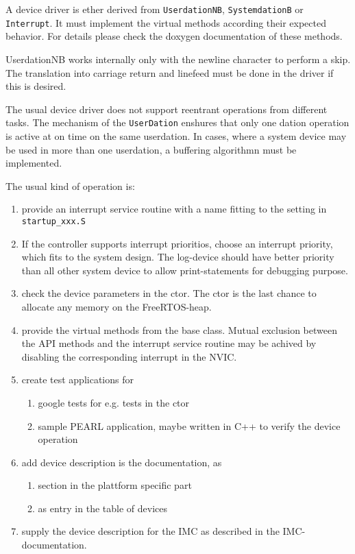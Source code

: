 A device driver is ether derived from \verb|UserdationNB|,
 \verb|SystemdationB| or \verb|Interrupt|.
It must implement the virtual methods according their
expected behavior. For details please check the doxygen documentation
of these methods.

UserdationNB works internally only with the newline character to 
perform a skip. The translation into carriage return and linefeed must
be done in the driver if this is desired.

The usual device driver does not support reentrant operations from
different tasks. 
The mechanism of the \verb|UserDation| enshures that only one dation
operation is active at on time on the same userdation. In cases, where
a system device may be used in more than one userdation, a buffering
algorithmn must be implemented. 

The usual kind of operation is:
\begin{enumerate}
\item provide an interrupt service routine with a name fitting to the
   setting in \verb|startup_xxx.S|
\item If the controller supports interrupt prioritios,
choose an interrupt priority, which fits to the system design.
 The log-device should have better priority than all other
 system device to allow print-statements for debugging purpose.
\item check the device parameters in the ctor. The ctor is the last chance to
   allocate any memory on the FreeRTOS-heap.
\item provide the virtual methods from the base class. Mutual exclusion
   between the API methods and the interrupt service routine may
   be achived by disabling the corresponding interrupt in the NVIC.
\item create test applications for 
  \begin{enumerate}
  \item google tests for e.g. tests in the ctor
  \item sample PEARL application, maybe  written in C++ to verify
        the device operation
  \end{enumerate}
\item add device description is the documentation, as
  \begin{enumerate}
  \item section in the plattform specific part
  \item as entry in the table of devices
  \end{enumerate}
\item supply the device description for the IMC as described in the IMC-documentation.
\end{enumerate}


